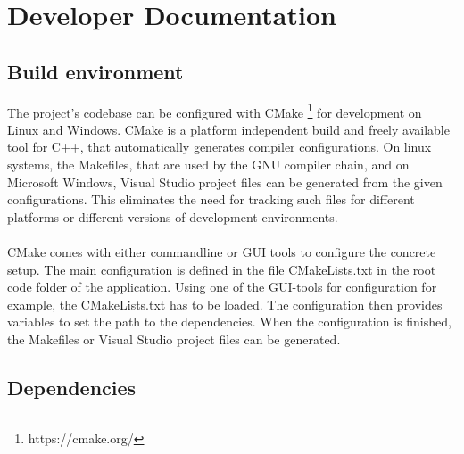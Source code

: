\section{Developer Documentation}\label{sec:devdoc}


\subsection{Build environment}

The project’s codebase can be configured with CMake \footnote{https://cmake.org/} for development on Linux and Windows. CMake is a platform independent build and freely available tool for C++, that automatically generates compiler configurations. On linux systems, the Makefiles, that are used by the GNU compiler chain, and on Microsoft Windows, Visual Studio project files can be generated from the given configurations. This eliminates the need for tracking such files for different platforms or different versions of development environments.
\\
\\
CMake comes with either commandline or GUI tools to configure the concrete setup. The main configuration is defined in the file CMakeLists.txt in the root code folder of the application. Using one of the GUI-tools for configuration for example, the CMakeLists.txt has to be loaded. The configuration then provides variables to set the path to the dependencies. When the configuration is finished, the Makefiles or Visual Studio project files can be generated.


\subsection{Dependencies}

